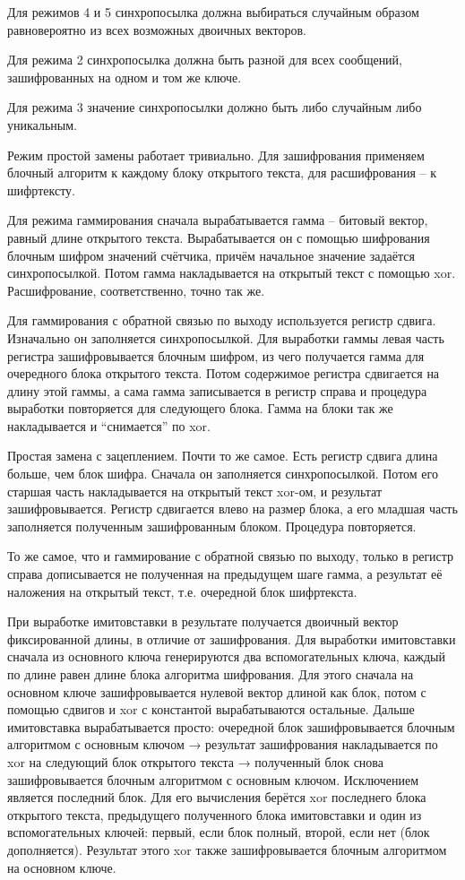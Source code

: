 Для режимов 4 и 5 синхропосылка должна выбираться случайным образом равновероятно из всех возможных двоичных векторов. 

Для режима 2 синхропосылка должна быть разной для всех сообщений, зашифрованных на одном и том же ключе.

Для режима 3 значение синхропосылки должно быть либо случайным либо уникальным.

Режим простой замены работает тривиально. Для зашифрования применяем блочный алгоритм к каждому блоку открытого текста, для расшифрования – к шифртексту.

Для режима гаммирования сначала вырабатывается гамма – битовый вектор, равный длине открытого текста. Вырабатывается он с помощью шифрования блочным шифром значений счётчика, причём начальное значение задаётся синхропосылкой. Потом гамма накладывается на открытый текст с помощью xor. Расшифрование, соответственно, точно так же.

Для гаммирования с обратной связью по выходу используется регистр сдвига. Изначально он заполняется синхропосылкой. Для выработки гаммы левая часть регистра зашифровывается блочным шифром, из чего получается гамма для очередного блока открытого текста. Потом содержимое регистра сдвигается на длину этой гаммы, а сама гамма записывается в регистр справа и процедура выработки повторяется для следующего блока. Гамма на блоки так же накладывается и “снимается” по xor.

Простая замена с зацеплением. Почти то же самое. Есть регистр сдвига длина больше, чем блок шифра. Сначала он заполняется синхропосылкой. Потом его старшая часть накладывается на открытый текст xor-ом, и результат зашифровывается. Регистр сдвигается влево на размер блока, а его младшая часть заполняется полученным зашифрованным блоком. Процедура повторяется.

То же самое, что и гаммирование с обратной связью по выходу, только в регистр справа дописывается не полученная на предыдущем шаге гамма, а результат её наложения на открытый текст, т.е. очередной блок шифртекста.

При выработке имитовставки в результате получается двоичный вектор фиксированной длины, в отличие от зашифрования. Для выработки имитовставки сначала из основного ключа генерируются два вспомогательных ключа, каждый по длине равен длине блока алгоритма шифрования. Для этого сначала на основном ключе зашифровывается нулевой вектор длиной как блок, потом с помощью сдвигов и xor с константой вырабатываются остальные. Дальше имитовставка вырабатывается просто: очередной блок зашифровывается блочным алгоритмом с основным ключом → результат зашифрования накладывается по xor на следующий блок открытого текста → полученный блок снова зашифровывается блочным алгоритмом с основным ключом. Исключением является последний блок. Для его вычисления берётся xor последнего блока открытого текста, предыдущего полученного блока имитовставки и один из вспомогательных ключей: первый, если блок полный, второй, если нет (блок дополняется). Результат этого xor также зашифровывается блочным алгоритмом на основном ключе.